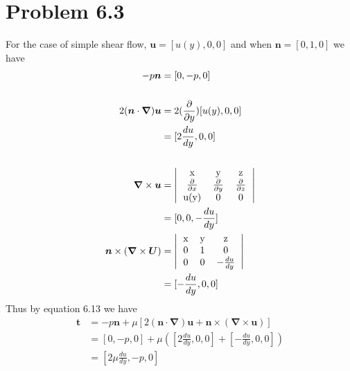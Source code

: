 \documentclass[12pt]{article}
\newcommand{\eq}[1]{\begin{align*}#1\end{align*}}
\newcommand{\p}[2]{\frac{\partial#1}{\partial#2}}
\newcommand{\de}[2]{\frac{d#1}{d#2}}
\newcommand{\n}{\bm{\nabla}}
\newcommand{\cross}{\times}
\newcommand{\tc}[3]{#1\times(#2\times#3)}
\newcommand{\dete}[2]{\left|\begin{tabular}{#1}#2\end{tabular}\right|}
\begin{document}
\section*{Problem 6.3}
For the case of simple shear flow, $\bm{u} = [u(y), 0, 0]$ and when $\bm{n} = [0, 1, 0]$ we have
\eq{
	-p\bm{n} &= [0, -p, 0]\\
	\\
	2(\bm{n}\cdot\n)\bm{u} &= 2(\p{}{y})[u(y), 0, 0]\\
	&= [2\de{u}{y}, 0, 0]\\
	\\
	\n\cross\bm{u} &= \dete{ccc}{
		x & y & z \\
		$\p{}{x}$ & $\p{}{y}$ & $\p{}{z}$ \\
		u(y) & 0 & 0 \\
	}\\
	&= [0, 0, -\de{u}{y}]\\
	\tc{\bm{n}}{\n}{\bm{U}} &= \dete{ccc}{
		x & y & z \\
		0 & 1 & 0 \\
		0 & 0 & $-\de{u}{y}$ \\
	}\\
	&= [-\de{u}{y}, 0, 0]
}
Thus by equation 6.13 we have
\eq{
	\bm{t} &= -p\bm{n} + \mu[2(\bm{n}\cdot\n)\bm{u} + \tc{\bm{n}}{\n}{\bm{u}}]\\
	&= [0, -p, 0] + \mu\left([2\de{u}{y}, 0, 0] + [-\de{u}{y}, 0, 0]\right)\\
	&= [2\mu\de{u}{y}, -p, 0]
}
\end{document}
